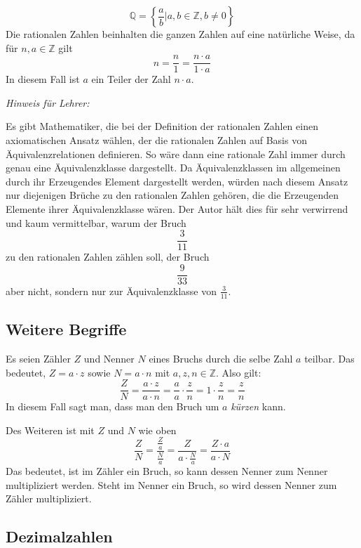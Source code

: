 \[ \mathbb{Q} = \left\{ \frac{a}{b} \vert a,b \in \mathbb{Z}, b\ne 0 \right\} \]
Die rationalen Zahlen beinhalten die ganzen Zahlen auf eine natürliche Weise, da für $n,a\in \mathbb{Z}$ gilt
\[ n = \frac{n}{1} = \frac{n \cdot a}{1\cdot a}\]
In diesem Fall ist $a$ ein Teiler der Zahl $n\cdot a$. 

\begin{svgraybox}
\textsl{Hinweis für Lehrer:}

Es gibt Mathematiker, die bei der Definition der rationalen Zahlen einen axiomatischen Ansatz wählen, der die rationalen Zahlen auf Basis von Äquivalenzrelationen definieren. So wäre dann eine rationale Zahl immer durch genau eine Äquivalenzklasse dargestellt. Da Äquivalenzklassen im allgemeinen durch ihr Erzeugendes Element dargestellt werden, würden nach diesem Ansatz nur diejenigen Brüche zu den rationalen Zahlen gehören, die die Erzeugenden Elemente ihrer Äquivalenzklasse wären. Der Autor hält dies für sehr verwirrend und kaum vermittelbar, warum der Bruch 
\[ \frac{3}{11}\]
zu den rationalen Zahlen zählen soll, der Bruch
\[ \frac{9}{33}\]
aber nicht, sondern nur zur Äquivalenzklasse von $\frac{3}{11}$.
\end{svgraybox}

\subsection{Weitere Begriffe}

\begin{definition}
Es seien Zähler $Z$ und Nenner $N$ eines Bruchs durch die selbe Zahl $a$ teilbar. Das bedeutet, $Z=a\cdot z$ sowie $N=a\cdot n$ mit $a,z,n\in \mathbb{Z}$. Also gilt:
\[
\frac{Z}{N} = \frac{a\cdot z}{a\cdot n} = \frac{a}{a}\cdot \frac{z}{n} = 1\cdot \frac{z}{n} = \frac{z}{n}
\]
In diesem Fall sagt man, dass man den Bruch um $a$ \textsl{kürzen} kann.
\end{definition}

Des Weiteren ist mit $Z$ und $N$ wie oben
\[
\frac{Z}{N} = \frac{\frac{Z}{a}}{\frac{N}{a}} = \frac{Z}{a\cdot \frac{N}{a}} = \frac{Z \cdot a}{a\cdot N}
\]
Das bedeutet, ist im Zähler ein Bruch, so kann dessen Nenner zum Nenner multipliziert werden. Steht im Nenner ein Bruch, so wird dessen Nenner zum Zähler multipliziert. 

\subsection{Dezimalzahlen}


